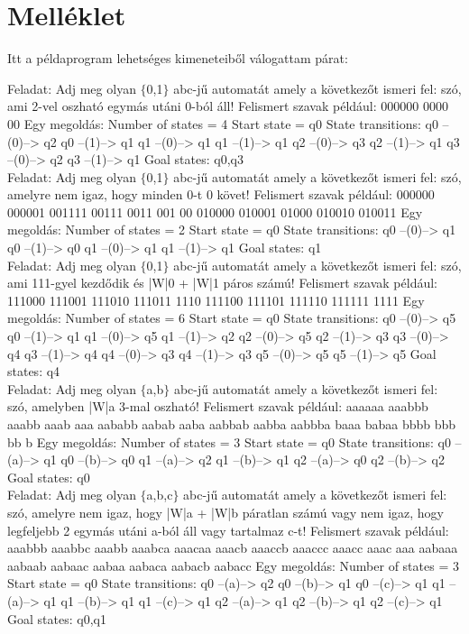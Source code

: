 \documentclass[12pt]{report}
\theoremstyle{definition}
\begin{document}
\chapter*{Melléklet}
Itt a példaprogram lehetséges kimeneteiből válogattam párat:\\
{\obeylines
\setlength\parindent{0pt}
Feladat: Adj meg olyan $\{$0,1$\}$ abc-jű automatát amely a következőt ismeri fel: szó, ami 2-vel oszható egymás utáni 0-ból áll!
Felismert szavak például:
000000 0000 00 
Egy megoldás:
Number of states = 4
Start state = q0
State transitions:
q0 --(0)--> q2
q0 --(1)--> q1
q1 --(0)--> q1
q1 --(1)--> q1
q2 --(0)--> q3
q2 --(1)--> q1
q3 --(0)--> q2
q3 --(1)--> q1
Goal states: 
q0,q3\\
Feladat: Adj meg olyan $\{$0,1$\}$ abc-jű automatát amely a következőt ismeri fel: szó, amelyre nem igaz, hogy minden 0-t 0 követ!
Felismert szavak például:
000000 000001 001111 00111 0011 001 00 010000 010001 01000 010010 010011
Egy megoldás:
Number of states = 2
Start state = q0
State transitions:
q0 --(0)--> q1
q0 --(1)--> q0
q1 --(0)--> q1
q1 --(1)--> q1
Goal states: 
q1\\
Feladat: Adj meg olyan $\{$0,1$\}$ abc-jű automatát amely a következőt ismeri fel: szó, ami 111-gyel kezdődik és |W|0 + |W|1 páros számú!
Felismert szavak például:
111000 111001 111010 111011 1110 111100 111101 111110 111111 1111 
Egy megoldás:
Number of states = 6
Start state = q0
State transitions:
q0 --(0)--> q5
q0 --(1)--> q1
q1 --(0)--> q5
q1 --(1)--> q2
q2 --(0)--> q5
q2 --(1)--> q3
q3 --(0)--> q4
q3 --(1)--> q4
q4 --(0)--> q3
q4 --(1)--> q3
q5 --(0)--> q5
q5 --(1)--> q5
Goal states: 
q4\\
Feladat: Adj meg olyan $\{$a,b$\}$ abc-jű automatát amely a következőt ismeri fel: szó, amelyben |W|a 3-mal oszható!
Felismert szavak például:
aaaaaa aaabbb aaabb aaab aaa aababb aabab aaba aabbab aabba aabbba baaa babaa bbbb bbb bb b  
Egy megoldás:
Number of states = 3
Start state = q0
State transitions:
q0 --(a)--> q1
q0 --(b)--> q0
q1 --(a)--> q2
q1 --(b)--> q1
q2 --(a)--> q0
q2 --(b)--> q2
Goal states: 
q0\\
Feladat: Adj meg olyan $\{$a,b,c$\}$ abc-jű automatát amely a következőt ismeri fel: szó, amelyre nem igaz, hogy |W|a + |W|b páratlan számú vagy nem igaz, hogy legfeljebb 2 egymás utáni a-ból áll vagy tartalmaz c-t!
Felismert szavak például:
aaabbb aaabbc aaabb aaabca aaacaa aaacb aaaccb aaaccc aaacc aaac aaa aabaaa aabaab aabaac aabaa aabaca aabacb aabacc
Egy megoldás:
Number of states = 3
Start state = q0
State transitions:
q0 --(a)--> q2
q0 --(b)--> q1
q0 --(c)--> q1
q1 --(a)--> q1
q1 --(b)--> q1
q1 --(c)--> q1
q2 --(a)--> q1
q2 --(b)--> q1
q2 --(c)--> q1
Goal states: 
q0,q1

}
\end{document}
